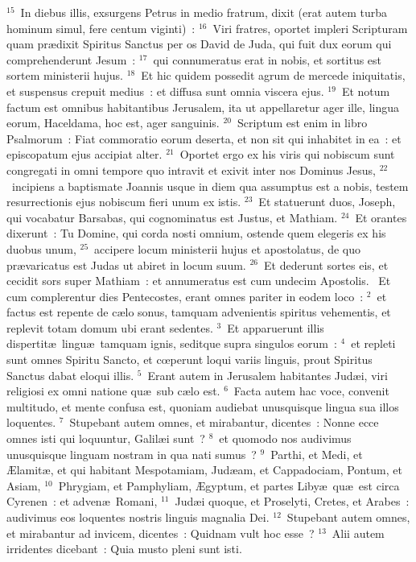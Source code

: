 ${}^{15}$~In diebus illis, exsurgens Petrus in medio fratrum, dixit (erat autem turba hominum simul, fere centum viginti)~:
${}^{16}$~Viri fratres, oportet impleri Scripturam quam pr\ae dixit Spiritus Sanctus per os David de Juda, qui fuit dux eorum qui comprehenderunt Jesum~:
${}^{17}$~qui connumeratus erat in nobis, et sortitus est sortem ministerii hujus.
${}^{18}$~Et hic quidem possedit agrum de mercede iniquitatis, et suspensus crepuit medius~: et diffusa sunt omnia viscera ejus.
${}^{19}$~Et notum factum est omnibus habitantibus Jerusalem, ita ut appellaretur ager ille, lingua eorum, Haceldama, hoc est, ager sanguinis.
${}^{20}$~Scriptum est enim in libro Psalmorum~: Fiat commoratio eorum deserta, et non sit qui inhabitet in ea~: et episcopatum ejus accipiat alter.
${}^{21}$~Oportet ergo ex his viris qui nobiscum sunt congregati in omni tempore quo intravit et exivit inter nos Dominus Jesus,
${}^{22}$~incipiens a baptismate Joannis usque in diem qua assumptus est a nobis, testem resurrectionis ejus nobiscum fieri unum ex istis.
${}^{23}$~Et statuerunt duos, Joseph, qui vocabatur Barsabas, qui cognominatus est Justus, et Mathiam.
${}^{24}$~Et orantes dixerunt~: Tu Domine, qui corda nosti omnium, ostende quem elegeris ex his duobus unum,
${}^{25}$~accipere locum ministerii hujus et apostolatus, de quo pr\ae varicatus est Judas ut abiret in locum suum.
${}^{26}$~Et dederunt sortes eis, et cecidit sors super Mathiam~: et annumeratus est cum undecim Apostolis.
~Et cum complerentur dies Pentecostes, erant omnes pariter in eodem loco~:
${}^{2}$~et factus est repente de c\ae lo sonus, tamquam advenientis spiritus vehementis, et replevit totam domum ubi erant sedentes.
${}^{3}$~Et apparuerunt illis dispertit\ae\ lingu\ae\ tamquam ignis, seditque supra singulos eorum~:
${}^{4}$~et repleti sunt omnes Spiritu Sancto, et cœperunt loqui variis linguis, prout Spiritus Sanctus dabat eloqui illis.
${}^{5}$~Erant autem in Jerusalem habitantes Jud\ae i, viri religiosi ex omni natione qu\ae\ sub c\ae lo est.
${}^{6}$~Facta autem hac voce, convenit multitudo, et mente confusa est, quoniam audiebat unusquisque lingua sua illos loquentes.
${}^{7}$~Stupebant autem omnes, et mirabantur, dicentes~: Nonne ecce omnes isti qui loquuntur, Galil\ae i sunt~?
${}^{8}$~et quomodo nos audivimus unusquisque linguam nostram in qua nati sumus~?
${}^{9}$~Parthi, et Medi, et \AE lamit\ae , et qui habitant Mespotamiam, Jud\ae am, et Cappadociam, Pontum, et Asiam,
${}^{10}$~Phrygiam, et Pamphyliam, \AE gyptum, et partes Liby\ae\ qu\ae\ est circa Cyrenen~: et adven\ae\ Romani,
${}^{11}$~Jud\ae i quoque, et Proselyti, Cretes, et Arabes~: audivimus eos loquentes nostris linguis magnalia Dei.
${}^{12}$~Stupebant autem omnes, et mirabantur ad invicem, dicentes~: Quidnam vult hoc esse~?
${}^{13}$~Alii autem irridentes dicebant~: Quia musto pleni sunt isti.


